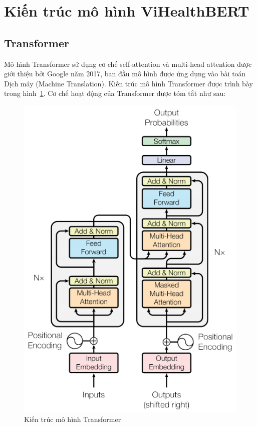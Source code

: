 \section{Kiến trúc mô hình ViHealthBERT}
\subsection{Transformer}
Mô hình Transformer sử dụng cơ chế self-attention và multi-head attention được giới thiệu bởi Google năm 2017\cite{DBLP:journals/corr/VaswaniSPUJGKP17}, ban đầu mô hình được ứng dụng vào bài toán Dịch máy (Machine Translation). Kiến trúc mô hình Transformer được trình bày trong hình~\ref{fig:transformer_diagram}. Cơ chế hoạt động của Transformer được tóm tắt như sau:

\begin{figure}
\centering
\includegraphics[scale=.4]{img/transformer.png}
\caption{Kiến trúc mô hình Transformer\cite{DBLP:journals/corr/VaswaniSPUJGKP17}}
\label{fig:transformer_diagram}
\end{figure}
